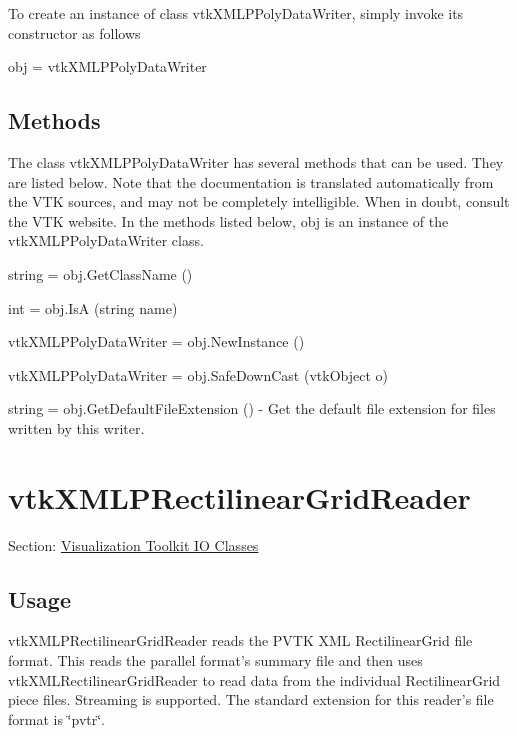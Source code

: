 To create an instance of class vtk\-X\-M\-L\-P\-Poly\-Data\-Writer, simply invoke its constructor as follows \begin{DoxyVerb}  obj = vtkXMLPPolyDataWriter
\end{DoxyVerb}
 \hypertarget{vtkwidgets_vtkxyplotwidget_Methods}{}\subsection{Methods}\label{vtkwidgets_vtkxyplotwidget_Methods}
The class vtk\-X\-M\-L\-P\-Poly\-Data\-Writer has several methods that can be used. They are listed below. Note that the documentation is translated automatically from the V\-T\-K sources, and may not be completely intelligible. When in doubt, consult the V\-T\-K website. In the methods listed below, {\ttfamily obj} is an instance of the vtk\-X\-M\-L\-P\-Poly\-Data\-Writer class. 
\begin{DoxyItemize}
\item {\ttfamily string = obj.\-Get\-Class\-Name ()}  
\item {\ttfamily int = obj.\-Is\-A (string name)}  
\item {\ttfamily vtk\-X\-M\-L\-P\-Poly\-Data\-Writer = obj.\-New\-Instance ()}  
\item {\ttfamily vtk\-X\-M\-L\-P\-Poly\-Data\-Writer = obj.\-Safe\-Down\-Cast (vtk\-Object o)}  
\item {\ttfamily string = obj.\-Get\-Default\-File\-Extension ()} -\/ Get the default file extension for files written by this writer.  
\end{DoxyItemize}\hypertarget{vtkio_vtkxmlprectilineargridreader}{}\section{vtk\-X\-M\-L\-P\-Rectilinear\-Grid\-Reader}\label{vtkio_vtkxmlprectilineargridreader}
Section\-: \hyperlink{sec_vtkio}{Visualization Toolkit I\-O Classes} \hypertarget{vtkwidgets_vtkxyplotwidget_Usage}{}\subsection{Usage}\label{vtkwidgets_vtkxyplotwidget_Usage}
vtk\-X\-M\-L\-P\-Rectilinear\-Grid\-Reader reads the P\-V\-T\-K X\-M\-L Rectilinear\-Grid file format. This reads the parallel format's summary file and then uses vtk\-X\-M\-L\-Rectilinear\-Grid\-Reader to read data from the individual Rectilinear\-Grid piece files. Streaming is supported. The standard extension for this reader's file format is \char`\"{}pvtr\char`\"{}.

